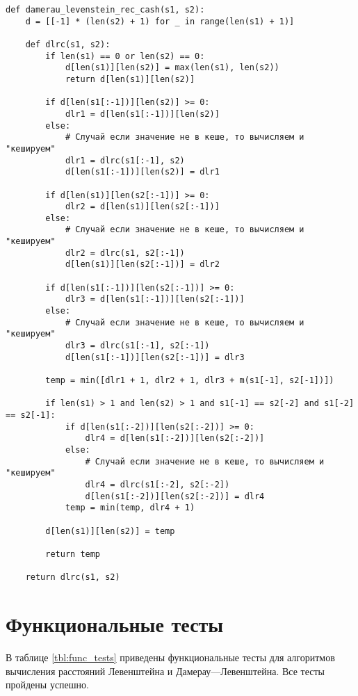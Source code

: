 \begin{lstlisting}[label=lst:dameray_lev_rec_hash,caption=Функция нахождения расстояния Дамерау-Левенштейна рекурсивно c кешированием]
def damerau_levenstein_rec_cash(s1, s2):
	d = [[-1] * (len(s2) + 1) for _ in range(len(s1) + 1)]

	def dlrc(s1, s2):
		if len(s1) == 0 or len(s2) == 0:
			d[len(s1)][len(s2)] = max(len(s1), len(s2))
			return d[len(s1)][len(s2)]

		if d[len(s1[:-1])][len(s2)] >= 0:
			dlr1 = d[len(s1[:-1])][len(s2)]
		else:
			# Случай если значение не в кеше, то вычисляем и "кешируем"
			dlr1 = dlrc(s1[:-1], s2)
			d[len(s1[:-1])][len(s2)] = dlr1

		if d[len(s1)][len(s2[:-1])] >= 0:
			dlr2 = d[len(s1)][len(s2[:-1])]
		else:
			# Случай если значение не в кеше, то вычисляем и "кешируем"
			dlr2 = dlrc(s1, s2[:-1])
			d[len(s1)][len(s2[:-1])] = dlr2

		if d[len(s1[:-1])][len(s2[:-1])] >= 0:
			dlr3 = d[len(s1[:-1])][len(s2[:-1])]
		else:
			# Случай если значение не в кеше, то вычисляем и "кешируем"
			dlr3 = dlrc(s1[:-1], s2[:-1])
			d[len(s1[:-1])][len(s2[:-1])] = dlr3

		temp = min([dlr1 + 1, dlr2 + 1, dlr3 + m(s1[-1], s2[-1])])

		if len(s1) > 1 and len(s2) > 1 and s1[-1] == s2[-2] and s1[-2] == s2[-1]:
			if d[len(s1[:-2])][len(s2[:-2])] >= 0:
				dlr4 = d[len(s1[:-2])][len(s2[:-2])]
			else:
				# Случай если значение не в кеше, то вычисляем и "кешируем"
				dlr4 = dlrc(s1[:-2], s2[:-2])
				d[len(s1[:-2])][len(s2[:-2])] = dlr4
			temp = min(temp, dlr4 + 1)

		d[len(s1)][len(s2)] = temp

		return temp

	return dlrc(s1, s2)
\end{lstlisting}

\clearpage


\section{Функциональные тесты}

В таблице \ref{tbl:func_tests} приведены функциональные тесты для алгоритмов вычисления расстояний Левенштейна и Дамерау—Левенштейна. Все тесты пройдены успешно.

